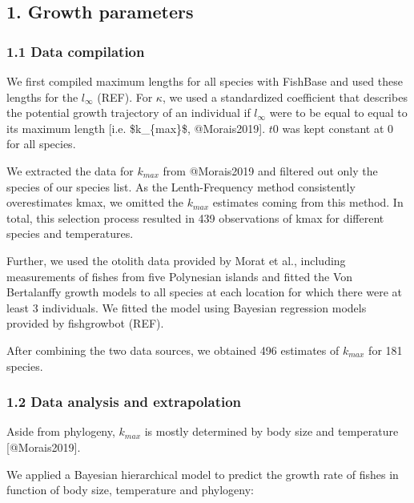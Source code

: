 \documentclass[12pt,a4paper]{article}
\begin{document}
\newpage

\hypertarget{growth-parameters}{%
\subsection{1. Growth parameters}\label{growth-parameters}}

\hypertarget{data-compilation}{%
\subsubsection{1.1 Data compilation}\label{data-compilation}}

We first compiled maximum lengths for all species with FishBase and used
these lengths for the \(l_{\infty}\) (REF). For \(\kappa\), we used a
standardized coefficient that describes the potential growth trajectory
of an individual if \(l_{\infty}\) were to be equal to equal to its
maximum length {[}i.e. \$k\_\{max\}\$, @Morais2019{]}. \(t0\) was kept
constant at 0 for all species.

We extracted the data for \(k_{max}\) from @Morais2019 and filtered out
only the species of our species list. As the Lenth-Frequency method
consistently overestimates kmax, we omitted the \(k_{max}\) estimates
coming from this method. In total, this selection process resulted in
439 observations of kmax for different species and temperatures.

Further, we used the otolith data provided by Morat et al., including
measurements of fishes from five Polynesian islands and fitted the Von
Bertalanffy growth models to all species at each location for which
there were at least 3 individuals. We fitted the model using Bayesian
regression models provided by fishgrowbot (REF).

After combining the two data sources, we obtained 496 estimates of
\(k_{max}\) for 181 species.

\hypertarget{data-analysis-and-extrapolation}{%
\subsubsection{1.2 Data analysis and
extrapolation}\label{data-analysis-and-extrapolation}}

\noindent Aside from phylogeny, \(k_{max}\) is mostly determined by body
size and temperature {[}@Morais2019{]}.

We applied a Bayesian hierarchical model to predict the growth rate of
fishes in function of body size, temperature and phylogeny:
\end{document}
